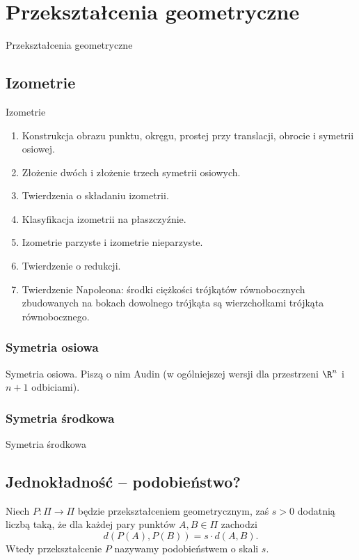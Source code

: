 \section{Przekształcenia geometryczne}
Przekształcenia geometryczne

\subsection{Izometrie}
Izometrie

\begin{enumerate}
    \item Konstrukcja obrazu punktu, okręgu, prostej przy translacji, obrocie i symetrii osiowej.
    \item Złożenie dwóch i złożenie trzech symetrii osiowych.
    \item Twierdzenia o składaniu izometrii.
    \item Klasyfikacja izometrii na płaszczyźnie.
    \item Izometrie parzyste i izometrie nieparzyste.
    \item Twierdzenie o redukcji.
    \item Twierdzenie Napoleona: środki ciężkości trójkątów równobocznych zbudowanych na bokach dowolnego trójkąta są wierzchołkami trójkąta równobocznego.
\end{enumerate}

\subsubsection{Symetria osiowa}
Symetria osiowa.
Piszą o nim Audin \cite[s. 49]{audin_2003} (w ogólniejszej wersji dla przestrzeni $\R^n$ i $n+1$ odbiciami).


\subsubsection{Symetria środkowa}
Symetria środkowa

\subsection{Jednokładność -- podobieństwo?}

\begin{definition}[podobieństwo]
    Niech $P \colon \Pi \to \Pi$ będzie przekształceniem geometrycznym, zaś $s > 0$ dodatnią liczbą taką, że dla każdej pary punktów $A, B \in \Pi$ zachodzi
    \begin{equation}
        d(P(A), P(B)) = s \cdot d(A, B).
    \end{equation}
    Wtedy przekształcenie $P$ nazywamy podobieństwem o skali $s$.
\end{definition}

